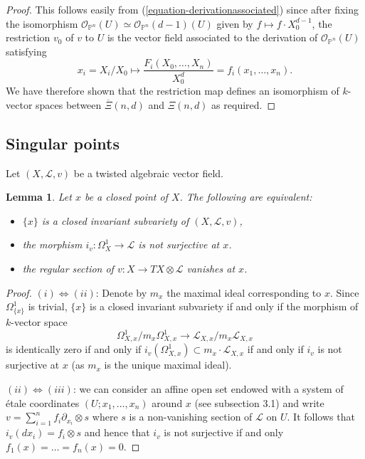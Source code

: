 \documentclass[12pt]{amsart}
\renewcommand{\P}{\mathbb{P}}
\theoremstyle{definition}
\theoremstyle{plain}
\newtheorem{lemma}[definition]{Lemma}
\theoremstyle{exampstyle}
\theoremstyle{exampstyle}\newtheorem{thmxbis}{Theorem}
\numberwithin{equation}{section}
\theoremstyle{remark}
\begin{document}
\begin{proof}
\noindent This follows easily from (\ref{equation-derivationassociated}) since after fixing the isomorphism 
$\mathcal O_{\P^n}(U) \simeq \mathcal O_{\P^n}(d-1)(U)$
given by $f \mapsto f\cdot X_0^{d-1}$, the restriction $v_0$ of $v$ to $U$ is the vector field associated to the derivation of $\mathcal O_{\P^n}(U)$ satisfying
$$x_i = X_i/X_0 \mapsto \frac {F_i(X_0,\ldots, X_n)} {X_0^d} = f_i(x_1,\ldots, x_n).$$
 We have therefore shown that the restriction map defines an isomorphism of $k$-vector spaces between $\overline{\Xi}(n,d)$ and $\Xi(n,d)$ as required. 
\end{proof}


\subsection{Singular points} Let $(X,\mathcal L,v)$ be a twisted algebraic vector field.

\begin{lemma} \label{lemma-singularity}
Let $x$ be a closed point of $X$. The following are equivalent: 
\begin{itemize}
\item[(i)] $\lbrace x \rbrace$ is a closed invariant subvariety of $(X,\mathcal L,v)$,
\item[(ii)] the morphism $i_v: \Omega^1_X \rightarrow \mathcal L$ is not surjective at $x$. 
\item[(iii)] the regular section of $v: X \rightarrow TX \otimes \mathcal L$ vanishes at $x$. 
\end{itemize} 
\end{lemma} 

\begin{proof} 
$(i) \Leftrightarrow (ii)$: Denote by $m_x$ the  maximal ideal corresponding to $x$. Since $\Omega^1_{\lbrace x \rbrace}$ is trivial, $\lbrace x \rbrace$ is a closed invariant subvariety if and only if the morphism of $k$-vector space
$$ \Omega^1_{X,x}/ m_x \Omega^1_{X,x} \rightarrow \mathcal L_{X,x} / m_x \mathcal L_{X,x}$$
is identically zero if and only if 
$i_v(\Omega^1_{X,x}) \subset m_x \cdot \mathcal L_{X,x}$
if and only if $i_v$ is not surjective at $x$ (as $m_x$ is the unique maximal ideal). 

$(ii) \Leftrightarrow (iii)$: we can consider an affine open set endowed with a system of étale coordinates $(U; x_1,\ldots, x_n)$ around $x$ (see subsection 3.1) and write 
$v = \sum_{i = 1}^n f_i \partial_{x_i} \otimes s$
where $s$ is a non-vanishing section of $\mathcal L$ on $U$.
It follows that $i_v(dx_i) = f_i \otimes s$ and hence that $i_v$ is not surjective if and only $f_1(x) = \ldots = f_n(x) = 0$.
\end{proof} 
\end{document}

